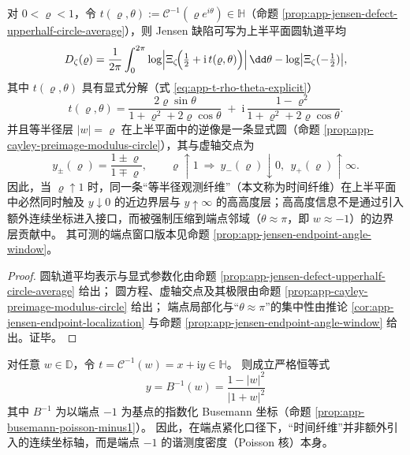 \begin{theorem}[时间纤维双端触及与端点压缩]\label{thm:dephys-timefiber-two-ended}
对 \(0<\varrho<1\)，令 \(t(\varrho,\theta):=\mathcal{C}^{-1}(\varrho e^{i\theta})\in\mathbb{H}\)（命题 \ref{prop:app-jensen-defect-upperhalf-circle-average}），则 Jensen 缺陷可写为上半平面圆轨道平均
\[
D_{\zeta}(\varrho)=\frac{1}{2\pi}\int_{0}^{2\pi}\log\Bigl|\Xi_{\zeta}\!\Bigl(\tfrac12+\mathrm{i}\,t(\varrho,\theta)\Bigr)\Bigr|\,\dd\theta
-\log\bigl|\Xi_{\zeta}(-\tfrac12)\bigr|,
\]
其中 \(t(\varrho,\theta)\) 具有显式分解（式 \eqref{eq:app-t-rho-theta-explicit}）
\[
t(\varrho,\theta)
=\frac{2\varrho\sin\theta}{1+\varrho^2+2\varrho\cos\theta}
\;+\;
\mathrm{i}\,\frac{1-\varrho^2}{1+\varrho^2+2\varrho\cos\theta}.
\]
并且等半径层 \(|w|=\varrho\) 在上半平面中的逆像是一条显式圆（命题 \ref{prop:app-cayley-preimage-modulus-circle}），其与虚轴交点为
\[
y_{\pm}(\varrho)=\frac{1\pm\varrho}{1\mp\varrho},
\qquad
\varrho\uparrow 1\ \Longrightarrow\ y_{-}(\varrho)\downarrow 0,\ \ y_{+}(\varrho)\uparrow\infty.
\]
因此，当 \(\varrho\uparrow 1\) 时，同一条“等半径观测纤维”（本文称为时间纤维）在上半平面中必然同时触及
\(y\downarrow 0\) 的近边界层与 \(y\uparrow\infty\) 的高高度层；高高度信息不是通过引入额外连续坐标进入接口，而被强制压缩到端点邻域（\(\theta\approx\pi\)，即 \(w\approx-1\)）的边界层贡献中。
其可测的端点窗口版本见命题 \ref{prop:app-jensen-endpoint-angle-window}。
\end{theorem}

\begin{proof}
圆轨道平均表示与显式参数化由命题 \ref{prop:app-jensen-defect-upperhalf-circle-average} 给出；
圆方程、虚轴交点及其极限由命题 \ref{prop:app-cayley-preimage-modulus-circle} 给出；
端点局部化与“\(\theta\approx\pi\)”的集中性由推论 \ref{cor:app-jensen-endpoint-localization} 与命题 \ref{prop:app-jensen-endpoint-angle-window} 给出。证毕。
\end{proof}

\begin{corollary}\label{cor:dephys-poisson-busemann-timefiber}
对任意 \(w\in\mathbb{D}\)，令 \(t=\mathcal{C}^{-1}(w)=x+\mathrm{i}y\in\mathbb{H}\)。
则成立严格恒等式
\[
\boxed{\;y=B^{-1}(w)=\frac{1-|w|^2}{|1+w|^2}\;}
\]
其中 \(B^{-1}\) 为以端点 \(-1\) 为基点的指数化 Busemann 坐标（命题 \ref{prop:app-busemann-poisson-minus1}）。
因此，在端点紧化口径下，“时间纤维”并非额外引入的连续坐标轴，而是端点 \(-1\) 的谐测度密度（Poisson 核）本身。
\end{corollary}

